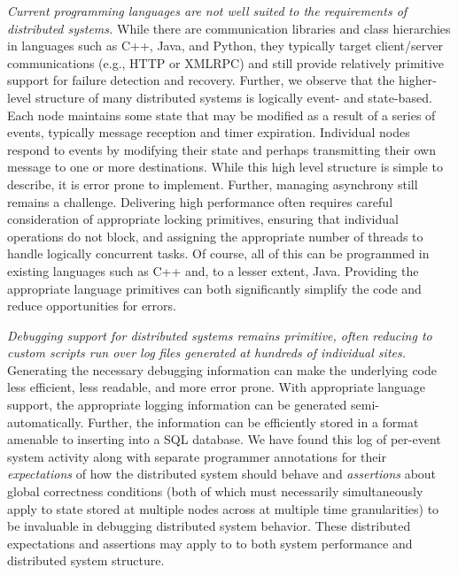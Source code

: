 \emph{Current programming languages are not well suited to the
requirements of distributed systems.} While there are communication
libraries and class hierarchies in languages such as C++, Java, and
Python, they typically target client/server communications (e.g., HTTP
or XMLRPC) and still provide relatively primitive support for failure
detection and recovery.  Further, we observe that the higher-level
structure of many distributed systems is logically event- and
state-based.  Each node maintains some state that may be modified as a
result of a series of events, typically message reception and timer
expiration.  Individual nodes respond to events by modifying their
state and perhaps transmitting their own message to one or more
destinations.  While this high level structure is simple to describe,
it is error prone to implement.  Further, managing asynchrony still
remains a challenge.  Delivering high performance often requires
careful consideration of appropriate locking primitives, ensuring that
individual operations do not block, and assigning the appropriate
number of threads to handle logically concurrent tasks.  Of course,
all of this can be programmed in existing languages such as C++ and,
to a lesser extent, Java. Providing the appropriate language
primitives can both significantly simplify the code and reduce
opportunities for errors.


\emph{Debugging support for distributed systems remains primitive,
often reducing to custom scripts run over log files generated at
hundreds of individual sites.}  Generating the necessary debugging
information can make the underlying code less efficient, less
readable, and more error prone.  With appropriate language support,
the appropriate logging information can be generated
semi-automatically.  Further, the information can be efficiently
stored in a format amenable to inserting into a SQL database.  We have
found this log of per-event system activity along with separate
programmer annotations for their \emph{expectations} of how the
distributed system should behave and \emph{assertions} about global
correctness conditions (both of which must necessarily simultaneously
apply to state stored at multiple nodes across at multiple time
granularities) to be invaluable in debugging distributed system
behavior.  These distributed expectations and assertions may apply to
to both system performance and distributed system structure.
 
